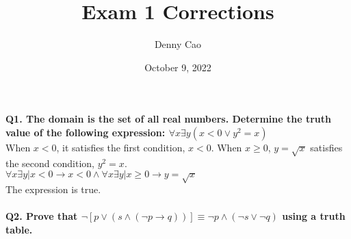 \documentclass[letterpaper,12pt]{article}
\begin{document}
\onehalfspacing

\setlength\parindent{0pt}
\title{Exam 1 Corrections}
\author{Denny Cao}
\date{October 9, 2022}
\maketitle
\textbf{Q1. The domain is the set of all real numbers. Determine the truth value of the following expression: $\forall x \exists y (x < 0 \lor y^2 = x)$} \\
When $x < 0$, it satisfies the first condition, $x<0$. When $x \geq 0$, $y=\sqrt{x}$ satisfies the second condition, $y^2=x$. \\ 
$\forall x \exists y|x < 0 \rightarrow x < 0 \land \forall x \exists y|x \geq 0 \rightarrow y = \sqrt{x}$ \\
The expression is true. \\
\\
\textbf{Q2. Prove that $\neg[p \lor (s \land (\neg p \rightarrow q))] \equiv \neg p \land (\neg s \lor \neg q)$ using a truth table.}
\end{document}
